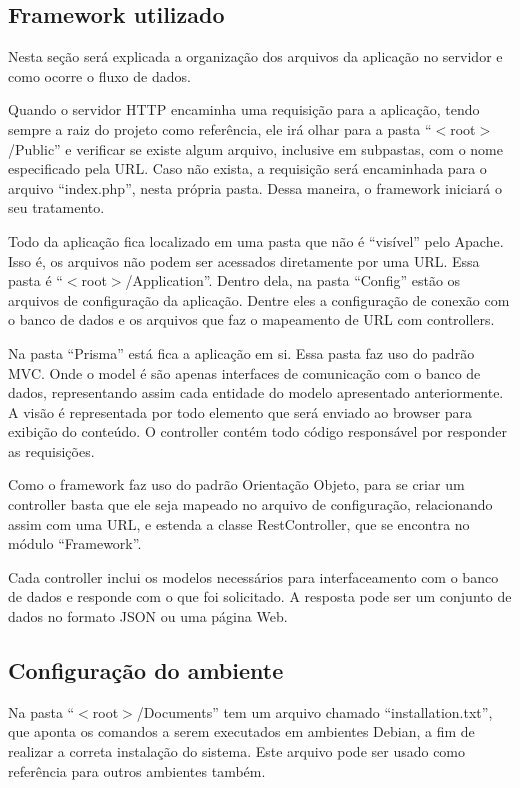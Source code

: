 \documentclass[graduacao,brazil]{ThesisPUC}
\begin{document}
\subsection{Framework utilizado}

Nesta seção será explicada a organização dos arquivos da aplicação no servidor e como ocorre o fluxo de dados.

Quando o servidor HTTP encaminha uma requisição para a aplicação, tendo sempre a raiz do projeto como referência, ele irá olhar para a pasta “$<$root$>$/Public” e verificar se existe algum arquivo, inclusive em subpastas, com o nome especificado pela URL. Caso não exista, a requisição será encaminhada para o arquivo “index.php”, nesta própria pasta. Dessa maneira, o framework iniciará o seu tratamento.

Todo da aplicação fica localizado em uma pasta que não é “visível” pelo Apache. Isso é, os arquivos não podem ser acessados diretamente por uma URL. Essa pasta é “$<$root$>$/Application”. Dentro dela, na pasta “Config” estão os arquivos de configuração da aplicação. Dentre eles a configuração de conexão com o banco de dados e os arquivos que faz o mapeamento de URL com controllers.

Na pasta “Prisma” está fica a aplicação em si. Essa pasta faz uso do padrão MVC. Onde o model é são apenas interfaces de comunicação com o banco de dados, representando assim cada entidade do modelo apresentado anteriormente. A visão é representada por todo elemento que será enviado ao browser para exibição do conteúdo. O controller contém todo código responsável por responder as requisições.

Como o framework faz uso do padrão Orientação Objeto, para se criar um controller basta que ele seja mapeado no arquivo de configuração, relacionando assim com uma URL, e estenda a classe RestController, que se encontra no módulo “Framework”.

Cada controller inclui os modelos necessários para interfaceamento com o banco de dados e responde com o que foi solicitado. A resposta pode ser um conjunto de dados no formato JSON ou uma página Web.

\subsection{Configuração do ambiente}

Na pasta “$<$root$>$/Documents” tem um arquivo chamado “installation.txt”, que aponta os comandos a serem executados em ambientes Debian, a fim de realizar a correta instalação do sistema. Este arquivo pode ser usado como referência para outros ambientes também.
\end{document}

